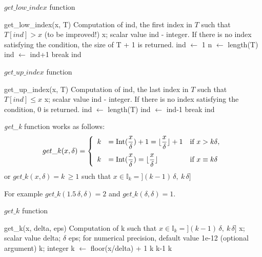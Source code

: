 \documentclass{article}
\newcommand{\be}{\begin{eqnarray*}}
\newcommand{\ee}{\end{eqnarray*}}
\newcommand{\dsp}{\displaystyle}
\def\Ik{\mathbb{I}_k}
\begin{document}
\begin{algorithm}[!h]
\caption{$get\_low\_index$ function}
\begin{algorithmic}[1] 
\Use get\_low\_index(x, T)
  \Desc Computation of ind, the first index in $T$ such that $T[ind]> x$ (to be improved!)
  \Input x; scalar value
\Output ind - integer. If there is no index satisfying the condition, the size of T + 1 is returned.
\State ind $\gets$ 1
\State n $\gets$ length(T)
\State ind $\gets$ ind+1
\Else
\State break
\EndIf
\EndWhile
\State \Return ind
\end{algorithmic}
\end{algorithm}

\begin{algorithm}[!h]
\caption{$get\_up\_index$ function}
\begin{algorithmic}[1] 
\Use get\_up\_index(x, T)
  \Desc Computation of ind, the last index in $T$ such that $T[ind]\leq x$
  \Input x; scalar value
\Output ind - integer. If there is no index satisfying the condition, 0 is returned.
\State ind $\gets$ length(T)
\State ind $\gets$ ind-1
\Else
\State break
\EndIf
\EndWhile
\State \Return ind
\end{algorithmic}
\end{algorithm}

\textit{get\_k} function works as follows:
\be
get\_k(x, \delta) = \left\{
\begin{array}{lll}
k&= \hbox{Int}(\dsp\frac{x}{\delta})+1 = \lfloor\dsp\frac{x}{\delta} \rfloor+1 &\hbox{if } {x > k\delta},\\[10pt]
k &= \hbox{Int}(\dsp\frac{x}{\delta}) = \lfloor\dsp\frac{x}{\delta} \rfloor &\hbox{if }{x \equiv k\delta}
\end{array}
\right.
\ee
or $get\_k(x,\delta) = k\, \geq 1$ such that $x \in \Ik=]{(k-1)}\,\delta,\:k\,\delta]$

For example $get\_k(1.5\,\delta, \delta)= 2$ and $get\_k(\delta, \delta)= 1$.

\begin{algorithm}[!h]
\caption{$get\_k$ function}
\begin{algorithmic}[1] 
\Use get\_k(x, delta, eps)
  \Desc Computation of k such that $x \in \Ik=]{(k-1)}\,\delta,\:k\,\delta]$
  \Input x; scalar value
\Input delta; $\delta$
\Input eps; for numerical precision, default value 1e-12 (optional argument)
\Output k; integer
\State k $\gets$ floor(x/delta) + 1
\State \Return k
\EndIf
{}
\State \Return k-1
\EndIf
\State \Return k
\end{algorithmic}
\end{algorithm}
\end{document}
